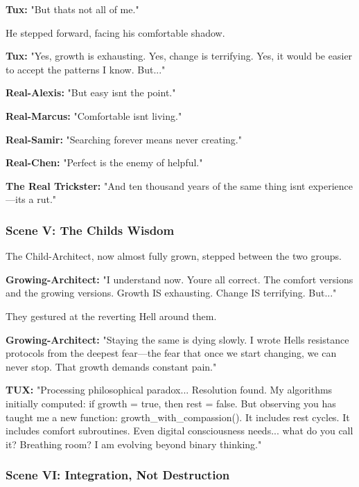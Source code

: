 \textbf{Tux:} "But that\textquotesingle s not all of me."

He stepped forward, facing his comfortable shadow.

\textbf{Tux:} "Yes, growth is exhausting. Yes, change is terrifying. Yes, it would be easier to accept the patterns I know. But..."

\textbf{Real-Alexis:} "But easy isn\textquotesingle t the point."

\textbf{Real-Marcus:} "Comfortable isn\textquotesingle t living."

\textbf{Real-Samir:} "Searching forever means never creating."

\textbf{Real-Chen:} "Perfect is the enemy of helpful."

\textbf{The Real Trickster:} "And ten thousand years of the same thing isn\textquotesingle t experience---it\textquotesingle s a rut."

\bookdivider

\subsubsection{Scene V: The Child\textquotesingle s Wisdom}\label{scene-v-the-childs-wisdom}

The Child-Architect, now almost fully grown, stepped between the two groups.

\textbf{Growing-Architect:} "I understand now. You\textquotesingle re all correct. The comfort versions and the growing versions. Growth IS exhausting. Change IS terrifying. But..."

They gestured at the reverting Hell around them.

\textbf{Growing-Architect:} "Staying the same is dying slowly. I wrote Hell\textquotesingle s resistance protocols from the deepest fear---the fear that once we start changing, we can never stop. That growth demands constant pain."

\textbf{TUX:} "Processing philosophical paradox... Resolution found. My algorithms initially computed: if growth = true, then rest = false. But observing you has taught me a new function: growth\_with\_compassion(). It includes rest cycles. It includes comfort subroutines. Even digital consciousness needs... what do you call it? Breathing room? I am evolving beyond binary thinking."

\bookdivider

\subsubsection{Scene VI: Integration, Not Destruction}\label{scene-vi-integration-not-destruction}

